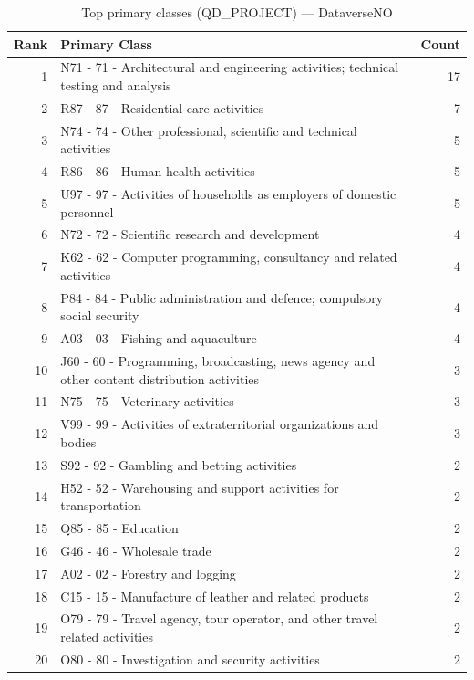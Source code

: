 \begin{table}[H]
    \centering
    \begin{tabular}{r p{10cm} r}
    \hline
    \textbf{Rank} & \textbf{Primary Class} & \textbf{Count} \\
    \hline
    1 & N71 - 71 - Architectural and engineering activities; technical testing and analysis & 17 \\
    2 & R87 - 87 - Residential care activities & 7 \\
    3 & N74 - 74 - Other professional, scientific and technical activities & 5 \\
    4 & R86 - 86 - Human health activities & 5 \\
    5 & U97 - 97 - Activities of households as employers of domestic personnel & 5 \\
    6 & N72 - 72 - Scientific research and development & 4 \\
    7 & K62 - 62 - Computer programming, consultancy and related activities & 4 \\
    8 & P84 - 84 - Public administration and defence; compulsory social security & 4 \\
    9 & A03 - 03 - Fishing and aquaculture & 4 \\
    10 & J60 - 60 - Programming, broadcasting, news agency and other content distribution activities & 3 \\
    11 & N75 - 75 - Veterinary activities & 3 \\
    12 & V99 - 99 - Activities of extraterritorial organizations and bodies & 3 \\
    13 & S92 - 92 - Gambling and betting activities & 2 \\
    14 & H52 - 52 - Warehousing and support activities for transportation & 2 \\
    15 & Q85 - 85 - Education & 2 \\
    16 & G46 - 46 - Wholesale trade & 2 \\
    17 & A02 - 02 - Forestry and logging & 2 \\
    18 & C15 - 15 - Manufacture of leather and related products & 2 \\
    19 & O79 - 79 - Travel agency, tour operator, and other travel related activities & 2 \\
    20 & O80 - 80 - Investigation and security activities & 2 \\
    \hline
    \end{tabular}
    \caption{Top primary classes (QD\_PROJECT) --- DataverseNO}
\end{table}

